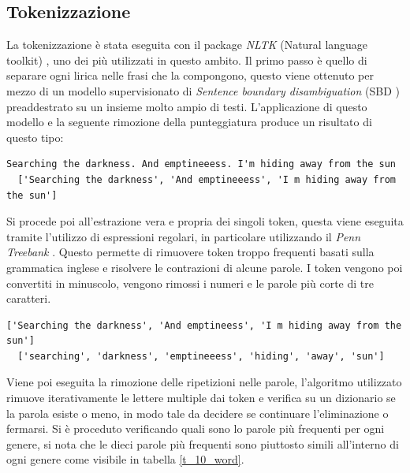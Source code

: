 \documentclass[technote]{IEEEtran}
\begin{document}
\subsection{Tokenizzazione}
La tokenizzazione è stata eseguita con il package \textit{NLTK}
(Natural language toolkit) \cite{Loper02nltk:the}, uno dei più utilizzati
in questo ambito. Il primo passo è quello di separare ogni lirica nelle
frasi che la compongono, questo viene ottenuto per mezzo di
un modello supervisionato di \textit{Sentence boundary disambiguation} (SBD
) preaddestrato su un insieme molto ampio di testi.
L'applicazione di questo modello e la seguente rimozione della punteggiatura
produce un risultato di questo tipo:

\begin{lstlisting}[basicstyle=\tiny]
  Searching the darkness. And emptineeess. I'm hiding away from the sun  
  ['Searching the darkness', 'And emptineeess', 'I m hiding away from the sun']  
\end{lstlisting}
Si procede poi all'estrazione vera e propria dei singoli token,
questa viene eseguita tramite l'utilizzo di espressioni regolari,
in particolare utilizzando il \textit{Penn Treebank}
\cite{marcus-etal-1993-building}. Questo permette di rimuovere
token troppo frequenti basati sulla grammatica inglese e risolvere
le contrazioni di alcune parole. I token vengono poi convertiti
in minuscolo, vengono rimossi i numeri e le parole più corte di tre caratteri.

\begin{lstlisting}[basicstyle=\tiny]
  ['Searching the darkness', 'And emptineess', 'I m hiding away from the sun']  
  ['searching', 'darkness', 'emptineeess', 'hiding', 'away', 'sun']
\end{lstlisting}
Viene poi eseguita la rimozione delle ripetizioni nelle parole,
l'algoritmo utilizzato rimuove iterativamente le lettere multiple
dai token e verifica su un dizionario se la parola esiste o meno, in
modo tale da decidere se continuare l'eliminazione o fermarsi.
Si è proceduto verificando quali sono lo parole più frequenti per ogni genere,
si nota che le dieci parole più frequenti sono piuttosto simili all'interno
di ogni genere come visibile in tabella \ref{t_10_word}.
\end{document}
